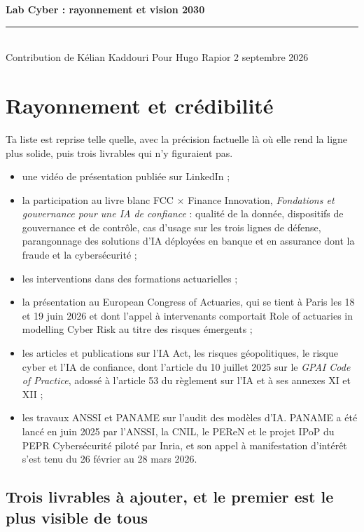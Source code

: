 \documentclass[11pt,a4paper]{article}
\begin{document}
\small

{\Large\bfseries\color{bleu} Lab Cyber : rayonnement et vision 2030}\\[3pt]
{\color{accent}\rule{\textwidth}{1.1pt}}\\[3pt]
{\footnotesize Contribution de Kélian Kaddouri \hfill Pour Hugo Rapior \textbullet{} 2 septembre 2026}

\vspace{4pt}

\section{Rayonnement et crédibilité}

\noindent Ta liste est reprise telle quelle, avec la précision factuelle là où elle rend la
ligne plus solide, puis trois livrables qui n'y figuraient pas.

\begin{itemize}
\item une vidéo de présentation publiée sur LinkedIn ;
\item la participation au livre blanc FCC $\times$ Finance Innovation, \emph{Fondations et
      gouvernance pour une IA de confiance} : qualité de la donnée, dispositifs de gouvernance
      et de contrôle, cas d'usage sur les trois lignes de défense, parangonnage des solutions
      d'IA déployées en banque et en assurance dont la fraude et la cybersécurité ;
\item les interventions dans des formations actuarielles ;
\item la présentation au European Congress of Actuaries, qui se tient à Paris les 18 et 19 juin
      2026 et dont l'appel à intervenants comportait \og{}Role of actuaries in modelling Cyber
      Risk\fg{} au titre des risques émergents ;
\item les articles et publications sur l'IA Act, les risques géopolitiques, le risque cyber et
      l'IA de confiance, dont l'article du 10 juillet 2025 sur le \emph{GPAI Code of Practice},
      adossé à l'article 53 du règlement sur l'IA et à ses annexes XI et XII ;
\item les travaux ANSSI et PANAME sur l'audit des modèles d'IA. PANAME a été lancé en juin 2025
      par l'ANSSI, la CNIL, le PEReN et le projet IPoP du PEPR Cybersécurité piloté par Inria,
      et son appel à manifestation d'intérêt s'est tenu du 26 février au 28 mars 2026.
\end{itemize}

\subsection{Trois livrables à ajouter, et le premier est le plus visible de tous}
\end{document}
